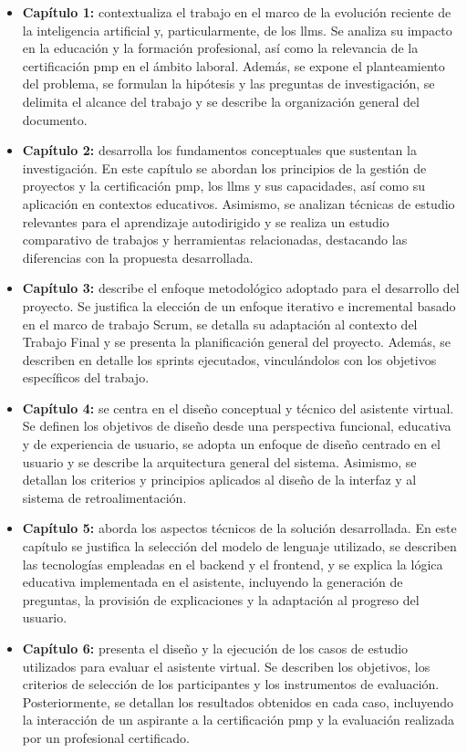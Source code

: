 \begin{itemize}
\item \textbf{Capítulo 1:} contextualiza el trabajo en el marco de la evolución reciente de la inteligencia artificial y, particularmente, de los \glspl{llm}. Se analiza su impacto en la educación y la formación profesional, así como la relevancia de la certificación \gls{pmp} en el ámbito laboral. Además, se expone el planteamiento del problema, se formulan la hipótesis y las preguntas de investigación, se delimita el alcance del trabajo y se describe la organización general del documento.
\item \textbf{Capítulo 2:} desarrolla los fundamentos conceptuales que sustentan la investigación. En este capítulo se abordan los principios de la gestión de proyectos y la certificación \gls{pmp}, los \glspl{llm} y sus capacidades, así como su aplicación en contextos educativos. Asimismo, se analizan técnicas de estudio relevantes para el aprendizaje autodirigido y se realiza un estudio comparativo de trabajos y herramientas relacionadas, destacando las diferencias con la propuesta desarrollada.
\item \textbf{Capítulo 3:} describe el enfoque metodológico adoptado para el desarrollo del proyecto. Se justifica la elección de un enfoque iterativo e incremental basado en el marco de trabajo Scrum, se detalla su adaptación al contexto del Trabajo Final y se presenta la planificación general del proyecto. Además, se describen en detalle los sprints ejecutados, vinculándolos con los objetivos específicos del trabajo.
\item \textbf{Capítulo 4:} se centra en el diseño conceptual y técnico del asistente virtual. Se definen los objetivos de diseño desde una perspectiva funcional, educativa y de experiencia de usuario, se adopta un enfoque de diseño centrado en el usuario y se describe la arquitectura general del sistema. Asimismo, se detallan los criterios y principios aplicados al diseño de la interfaz y al sistema de retroalimentación.
\item \textbf{Capítulo 5:} aborda los aspectos técnicos de la solución desarrollada. En este capítulo se justifica la selección del modelo de lenguaje utilizado, se describen las tecnologías empleadas en el backend y el frontend, y se explica la lógica educativa implementada en el asistente, incluyendo la generación de preguntas, la provisión de explicaciones y la adaptación al progreso del usuario.
\item \textbf{Capítulo 6:} presenta el diseño y la ejecución de los casos de estudio utilizados para evaluar el asistente virtual. Se describen los objetivos, los criterios de selección de los participantes y los instrumentos de evaluación. Posteriormente, se detallan los resultados obtenidos en cada caso, incluyendo la interacción de un aspirante a la certificación \gls{pmp} y la evaluación realizada por un profesional certificado.

\end{itemize}
